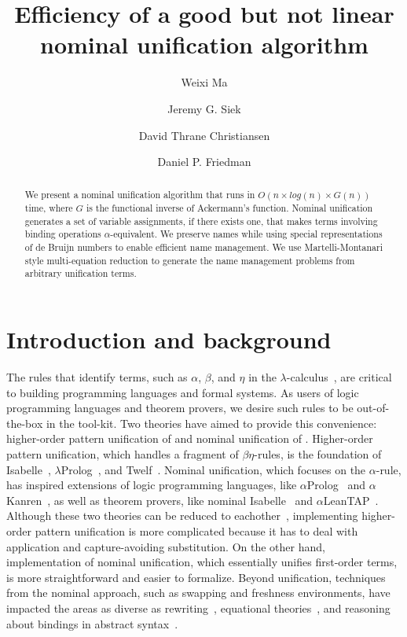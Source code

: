 \documentclass[a4paper,UKenglish]{lipics-v2016}
\title{Efficiency of a good but not linear nominal unification algorithm}
\author[1]{Weixi Ma}
\author[2]{Jeremy G. Siek}
\author[3]{David Thrane Christiansen}
\author[4]{Daniel P. Friedman}
\affil[1]{Indiana University,
  \texttt{mvc@iu.edu}}
\affil[2]{Indiana University,
  \texttt{jsiek@indiana.edu}}
\affil[3]{Galois, Inc.,
  \texttt{dtc@galois.com}}
\affil[4]{Indiana University,
  \texttt{dfried@indiana.edu}}
\begin{document}
\maketitle

\begin{abstract}
  We present a nominal unification algorithm that runs in $O(n \times
  log(n) \times G(n))$ time, where $G$ is the functional inverse of
  Ackermann's function.  Nominal unification generates a set of
  variable assignments, if there exists one, that makes terms
  involving binding operations $\alpha$-equivalent. We preserve names
  while using special representations of de Bruijn numbers
  to enable efficient name management.
  We use Martelli-Montanari style multi-equation reduction
  to generate the name management problems from arbitrary unification terms.
\end{abstract}

\section{Introduction and background}

The rules that identify terms, such as $\alpha$, $\beta$, and $\eta$
in the $\lambda$-calculus~\citep{church_calculi_1941}, are critical to
building programming languages and formal systems.  As users of logic
programming languages and theorem provers, we desire such rules to be
out-of-the-box in the tool-kit.  Two theories have aimed to provide
this convenience: higher-order pattern unification of
\citet{miller_logic_1989} and nominal unification of
\citet{urban_nominal_2004}.  Higher-order pattern unification, which
handles a fragment of $\beta\eta$-rules, is the foundation of
Isabelle~\citep{paulson_natural_1986},
$\lambda$Prolog~\citep{nadathur_overview_1988}, and
Twelf~\citep{pfenning_system_1999-1}.  Nominal unification, which
focuses on the $\alpha$-rule, has inspired extensions of logic
programming languages, like $\alpha$Prolog~\citep{cheney_prolog:_2004}
and $\alpha$Kanren~\citep{byrd_alphakanren:_2007}, as well as theorem
provers, like nominal Isabelle~\citep{urban_nominal_2005} and
$\alpha$LeanTAP~\citep{near_leantap:_2008}.  Although these two
theories can be reduced to eachother~\citep{cheney_relating_2005,
  levy_nominal_2012}, implementing higher-order pattern unification is
more complicated because it has to deal with application and
capture-avoiding substitution.  On the other hand, implementation of
nominal unification, which essentially unifies first-order terms, is
more straightforward and easier to formalize.  Beyond unification,
techniques from the nominal approach, such as swapping and freshness
environments, have impacted the areas as diverse as
rewriting~\citep{fernandez_nominal_2004, fernandez_nominal_2005,
  fernandez_nominal_2007, aoto_nominal_2016}, equational
theories~\citep{ayala-rincon_nominal_2016}, and reasoning about
bindings in abstract syntax~\citep{pitts_varlanguage_2000,
  gabbay_new_2002}.
\end{document}
